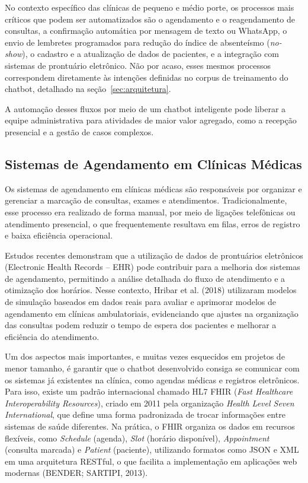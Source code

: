 \documentclass[12pt,a4paper]{extarticle}
\begin{document}
No contexto específico das clínicas de pequeno e médio porte, os processos mais críticos que podem ser automatizados são o agendamento e o reagendamento de consultas, a confirmação automática por mensagem de texto ou WhatsApp, o envio de lembretes programados para redução do índice de absenteísmo (\textit{no-show}), o cadastro e a atualização de dados de pacientes, e a integração com sistemas de prontuário eletrônico. Não por acaso, esses mesmos processos correspondem diretamente às intenções definidas no corpus de treinamento do chatbot, detalhado na seção~\ref{sec:arquitetura}.

A automação desses fluxos por meio de um chatbot inteligente pode liberar a equipe administrativa para atividades de maior valor agregado, como a recepção presencial e a gestão de casos complexos.

\subsection{Sistemas de Agendamento em Clínicas Médicas}

Os sistemas de agendamento em clínicas médicas são responsáveis por organizar e gerenciar a marcação de consultas, exames e atendimentos. Tradicionalmente, esse processo era realizado de forma manual, por meio de ligações telefônicas ou atendimento presencial, o que frequentemente resultava em filas, erros de registro e baixa eficiência operacional.

Estudos recentes demonstram que a utilização de dados de prontuários eletrônicos (Electronic Health Records -- EHR) pode contribuir para a melhoria dos sistemas de agendamento, permitindo a análise detalhada do fluxo de atendimento e a otimização dos horários. Nesse contexto, Hribar et al. (2018) utilizaram modelos de simulação baseados em dados reais para avaliar e aprimorar modelos de agendamento em clínicas ambulatoriais, evidenciando que ajustes na organização das consultas podem reduzir o tempo de espera dos pacientes e melhorar a eficiência do atendimento.

Um dos aspectos mais importantes, e muitas vezes esquecidos em projetos de menor tamanho, é garantir que o chatbot desenvolvido consiga se comunicar com os sistemas já existentes na clínica, como agendas médicas e registros eletrônicos. Para isso, existe um padrão internacional chamado HL7 FHIR (\textit{Fast Healthcare Interoperability Resources}), criado em 2011 pela organização \textit{Health Level Seven International}, que define uma forma padronizada de trocar informações entre sistemas de saúde diferentes. Na prática, o FHIR organiza os dados em recursos flexíveis, como \textit{Schedule} (agenda), \textit{Slot} (horário disponível), \textit{Appointment} (consulta marcada) e \textit{Patient} (paciente), utilizando formatos como JSON e XML em uma arquitetura RESTful, o que facilita a implementação em aplicações web modernas (BENDER; SARTIPI, 2013).
\end{document}
